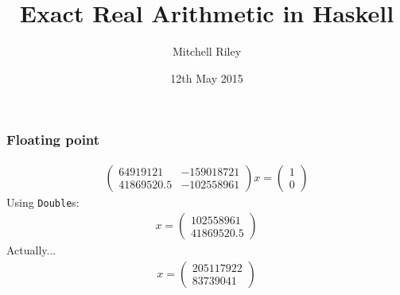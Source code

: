 \documentclass[11pt]{beamer}
\author{Mitchell Riley}
\title{Exact Real Arithmetic in Haskell}
\date{12th May 2015}
\begin{document}
\begin{frame}
\titlepage
\end{frame}

\begin{frame}
\frametitle{Floating point}
\begin{align*}
\begin{pmatrix}
64919121   & -159018721 \\
41869520.5 & -102558961
\end{pmatrix} x =
\begin{pmatrix}
1 \\
0
\end{pmatrix}
\end{align*}
\pause
Using \texttt{Double}s:
\begin{align*}
x =
\begin{pmatrix}
102558961 \\
41869520.5
\end{pmatrix}
\end{align*}
\pause
Actually...
\begin{align*}
x =
\begin{pmatrix}
205117922 \\
83739041
\end{pmatrix}
\end{align*}
\end{frame}

\begin{frame}
\nocite{*}
\printbibliography
\end{frame}
\end{document}
